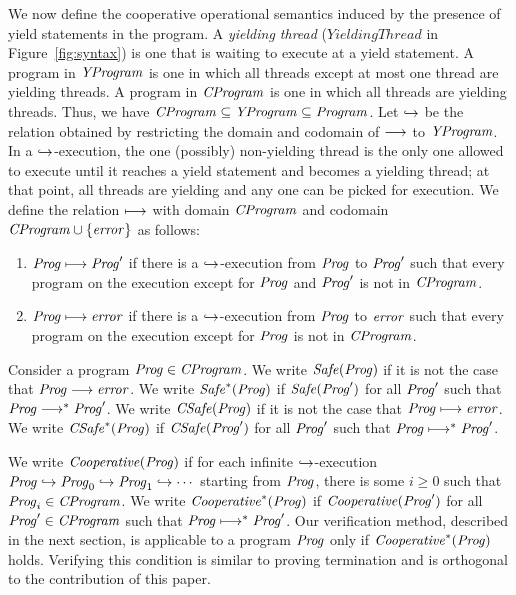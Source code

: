 We now define the cooperative operational semantics induced by the presence of yield statements in the program.
A {\em yielding thread\/} ($\mathit{YieldingThread}$ in Figure~\ref{fig:syntax}) is one that is waiting to execute at a yield statement.
A program in $\mathit{YProgram}$ is one in which all threads except at most one thread are yielding threads.
A program in $\mathit{CProgram}$ is one in which all threads are yielding threads.
Thus, we have $\mathit{CProgram} \subseteq \mathit{YProgram} \subseteq \mathit{Program}$.
Let $\hookrightarrow$ be the relation obtained by restricting the domain and codomain of $\longrightarrow$ to $\mathit{YProgram}$.
In a $\hookrightarrow$-execution, the one (possibly) non-yielding thread is the only one allowed to execute until it reaches 
a yield statement and becomes a yielding thread; at that point, all threads are yielding and any one can be picked for execution.
We define the relation $\longmapsto$ with domain $\mathit{CProgram}$ and codomain $\mathit{CProgram} \cup \{\mathit{error}\}$ as follows:
\begin{enumerate}
\item 
$\mathit{Prog} \longmapsto \mathit{Prog}'$ if there is a $\hookrightarrow$-execution from $\mathit{Prog}$ to $\mathit{Prog}'$ such that every program on the execution 
except for $\mathit{Prog}$ and $\mathit{Prog}'$ is not in $\mathit{CProgram}$.
\item
$\mathit{Prog} \longmapsto \mathit{error}$ if there is a $\hookrightarrow$-execution from $\mathit{Prog}$ to $\mathit{error}$ such that every program on the execution 
except for $\mathit{Prog}$ is not in $\mathit{CProgram}$.
\end{enumerate}

Consider a program $\mathit{Prog} \in \mathit{CProgram}$.
We write $\mathit{Safe}(\mathit{Prog})$ if it is not the case that $\mathit{Prog} \longrightarrow \mathit{error}$.
We write $\mathit{Safe}^*(\mathit{Prog})$ if $\mathit{Safe}(\mathit{Prog}')$ for all $\mathit{Prog}'$ such that $\mathit{Prog} \longrightarrow^* \mathit{Prog}'$.
We write $\mathit{CSafe}(\mathit{Prog})$ if it is not the case that $\mathit{Prog} \longmapsto \mathit{error}$.
We write $\mathit{CSafe}^*(\mathit{Prog})$ if $\mathit{CSafe}(\mathit{Prog}')$ for all $\mathit{Prog}'$ such that $\mathit{Prog} \longmapsto^* \mathit{Prog}'$.

We write $\mathit{Cooperative}(\mathit{Prog})$ if for each infinite $\hookrightarrow$-execution $\mathit{Prog} \hookrightarrow \mathit{Prog}_0 \hookrightarrow \mathit{Prog}_1 \hookrightarrow \cdots$ 
starting from $\mathit{Prog}$, there is some $i \geq 0$ such that $\mathit{Prog}_i \in \mathit{CProgram}$.
We write $\mathit{Cooperative}^*(\mathit{Prog})$ if $\mathit{Cooperative}(\mathit{Prog}')$ for all $\mathit{Prog}' \in \mathit{CProgram}$ such that $\mathit{Prog} \longmapsto^* \mathit{Prog}'$.
Our verification method, described in the next section, is applicable to a program $\mathit{Prog}$ only if $\mathit{Cooperative}^*(\mathit{Prog})$ holds.
Verifying this condition is similar to proving termination and is orthogonal to the contribution of this paper.
